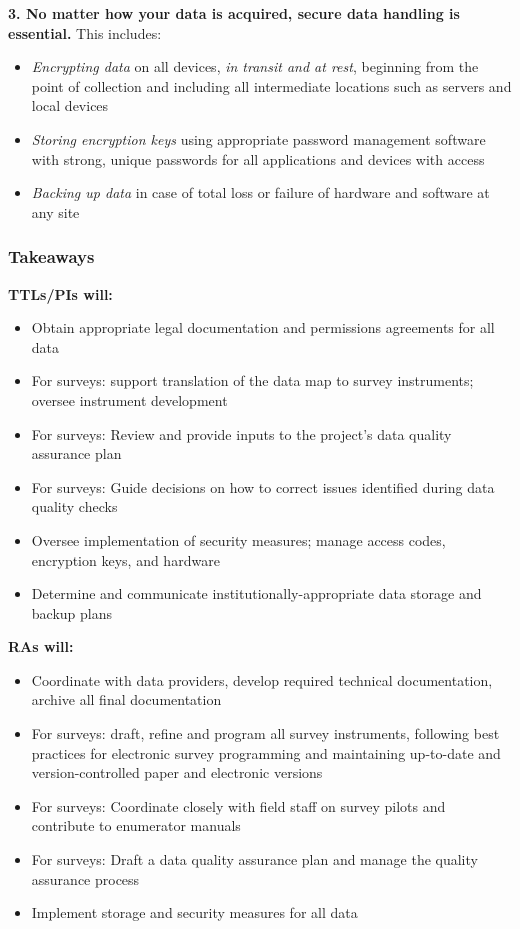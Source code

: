 \documentclass[
]{book}
\providecommand{\tightlist}{%
  \setlength{\itemsep}{0pt}\setlength{\parskip}{0pt}}
\begin{document}
\begin{summary}
\textbf{3. No matter how your data is acquired, secure data handling is essential.} This includes:

\begin{itemize}
\tightlist
\item
  \emph{Encrypting data} on all devices, \emph{in transit and at rest}, beginning from the point of collection and including all intermediate locations such as servers and local devices
\item
  \emph{Storing encryption keys} using appropriate password management software with strong, unique passwords for all applications and devices with access
\item
  \emph{Backing up data} in case of total loss or failure of hardware and software at any site
\end{itemize}

\hypertarget{takeaways-3}{%
\subsubsection*{Takeaways}\label{takeaways-3}}

\textbf{TTLs/PIs will:}

\begin{itemize}
\tightlist
\item
  Obtain appropriate legal documentation and permissions agreements for all data
\item
  For surveys: support translation of the data map to survey instruments; oversee instrument development
\item
  For surveys: Review and provide inputs to the project's data quality assurance plan
\item
  For surveys: Guide decisions on how to correct issues identified during data quality checks
\item
  Oversee implementation of security measures; manage access codes, encryption keys, and hardware
\item
  Determine and communicate institutionally-appropriate data storage and backup plans
\end{itemize}

\textbf{RAs will:}

\begin{itemize}
\tightlist
\item
  Coordinate with data providers, develop required technical documentation, archive all final documentation
\item
  For surveys: draft, refine and program all survey instruments, following best practices for electronic survey programming and maintaining up-to-date and version-controlled paper and electronic versions
\item
  For surveys: Coordinate closely with field staff on survey pilots and contribute to enumerator manuals
\item
  For surveys: Draft a data quality assurance plan and manage the quality assurance process
\item
  Implement storage and security measures for all data
\end{itemize}


\end{summary}
\end{document}
